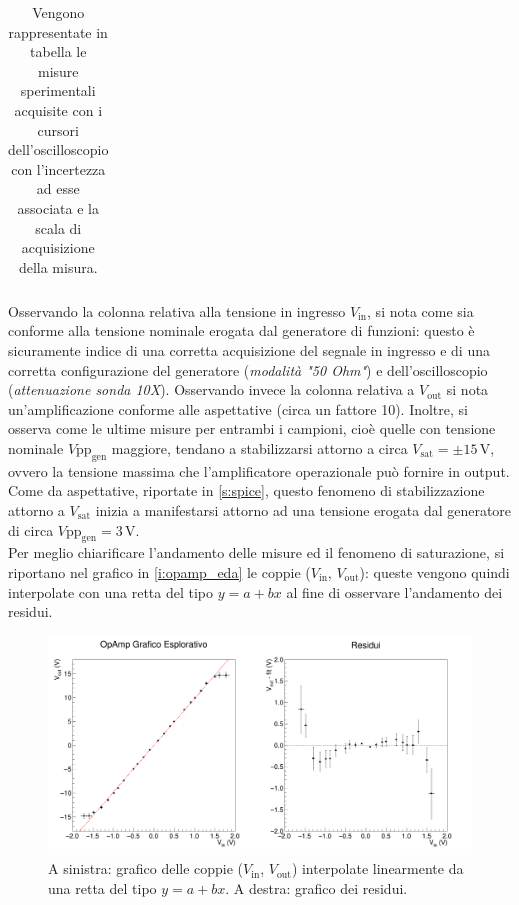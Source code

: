 \documentclass[a4paper,11pt]{article} %
\begin{document}
\begin{table}[H]
\begin{tabular}{x{2cm} x{3cm} x{3.2cm} x{3cm} x{3.2cm}}
		
		\bottomrule[0.5px]
		
	\end{tabular}
	\caption{Vengono rappresentate in tabella le misure sperimentali acquisite con i cursori dell'oscilloscopio 
				con l'incertezza ad esse associata e la scala di acquisizione della misura.}
	\label{t:osc_measures}
\end{table}	

\noindent  Osservando la colonna relativa alla tensione in ingresso $V_{\text{in}}$, si nota come sia conforme alla
tensione nominale erogata dal generatore di funzioni: questo è sicuramente indice di una corretta acquisizione del
segnale in ingresso e di una corretta configurazione del generatore (\textit{modalità "50 Ohm"}) e dell'oscilloscopio
(\textit{attenuazione sonda 10X}). Osservando invece la colonna relativa a $V_{\text{out}}$ si nota un'amplificazione
conforme alle aspettative (circa un fattore 10). Inoltre, si osserva come le ultime misure per entrambi i campioni, cioè
quelle con tensione nominale $V\text{pp}_{\text{gen}}$ maggiore, tendano a stabilizzarsi attorno a circa
$V_{\text{sat}}=\pm15\,\si{\volt}$, ovvero la tensione massima che l'amplificatore operazionale può fornire in output.
Come da aspettative, riportate in  \autoref{s:spice}, questo fenomeno di stabilizzazione attorno a $V_{\text{sat}}$
inizia a manifestarsi attorno ad una tensione erogata dal generatore di circa $V\text{pp}_{\text{gen}}=3\,\si{\volt}$.\\
Per meglio chiarificare l'andamento delle misure ed il fenomeno di saturazione, si riportano nel grafico in 
\autoref{i:opamp_eda} le coppie ($V_{\text{in}}$, $V_{\text{out}}$): queste vengono quindi interpolate con una retta del
tipo $y=a+bx$ al fine di osservare l'andamento dei residui. 

\begin{figure}[H]
	\centering
	\includegraphics[width=\linewidth]{../Plots/Report_Plots/opamp_plot_alldata_eda.png}
	\caption{A sinistra: grafico delle coppie ($V_{\text{in}}$, $V_{\text{out}}$) interpolate linearmente da una retta
	del tipo $y=a+bx$. A destra: grafico dei residui.}
	\label{i:opamp_eda}
\end{figure}
\end{document}
